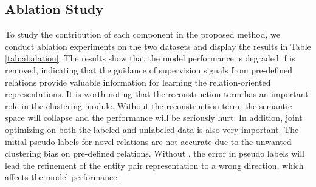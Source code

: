 \documentclass[11pt]{article}
\begin{document}
    \subsection{Ablation Study}
        \label{sec:ablation}
        \begin{table}
            \centering
            \caption{Abalation study of our method. This table only lists the results of metric . For results of other metrics, please refer to the Table \ref{tab:det_aba} in Appendix \ref{app:other}.}
            \label{tab:abalation}
        \end{table}              
        To study the contribution of each component in the proposed method, we conduct ablation experiments on the two datasets and display the results in Table \ref{tab:abalation}. The results show that the model performance is degraded if  is removed, indicating that the guidance of supervision signals from pre-defined relations provide valuable information for learning the relation-oriented representations. It is worth noting that the reconstruction term has an important role in the clustering module. Without the reconstruction term, the semantic space will collapse and the performance will be seriously hurt. In addition, joint optimizing on both the labeled and unlabeled data is also very important. The initial pseudo labels for novel relations are not accurate due to the unwanted clustering bias on pre-defined relations. Without , the error in pseudo labels will lead the refinement of the entity pair representation to a wrong direction, which affects the model performance.
    
\end{document}
